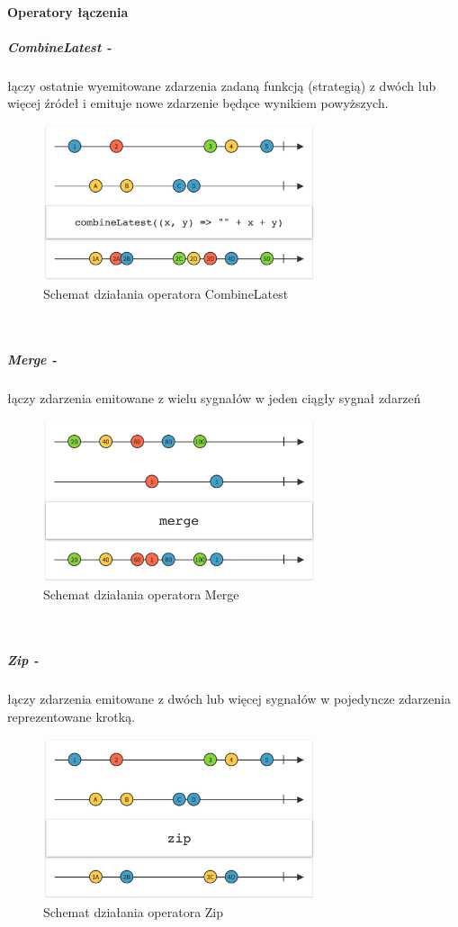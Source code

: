 \documentclass[12pt,oneside,a4paper]{report}
\begin{document}
\paragraph{Operatory łączenia}
\subparagraph{CombineLatest -}łączy ostatnie wyemitowane zdarzenia zadaną funkcją (strategią) z dwóch lub więcej źródeł i emituje nowe zdarzenie będące wynikiem powyższych. 
\begin{figure}[ht!]
	\centering
	\includegraphics[width=8cm]{combinelatest}
	\caption{Schemat działania operatora CombineLatest}
	\label{combinelatest}
\end{figure}\\
\subparagraph{Merge -}łączy zdarzenia emitowane z wielu sygnałów w jeden ciągły sygnał zdarzeń
\begin{figure}[ht!]
	\centering
	\includegraphics[width=8cm]{merge}
	\caption{Schemat działania operatora Merge}
	\label{merge}
\end{figure}\\
\subparagraph{Zip -}łączy zdarzenia emitowane z dwóch lub więcej sygnałów w pojedyncze zdarzenia reprezentowane krotką. 
\begin{figure}[ht!]
	\centering
	\includegraphics[width=8cm]{zip}
	\caption{Schemat działania operatora Zip}
	\label{zip}
\end{figure}\\
\end{document}
